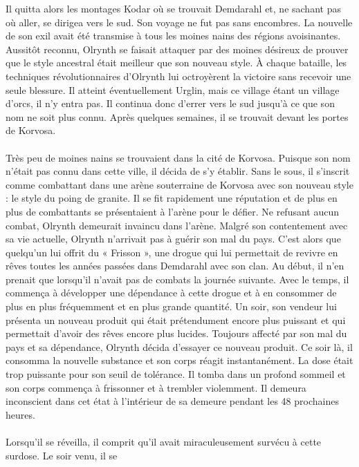 \documentclass[main.tex]{subfiles}
\begin{document}
    Il quitta alors les montages Kodar où se trouvait Demdarahl et, ne sachant pas où aller, se dirigea vers
    le sud. Son voyage ne fut pas sans encombres. La nouvelle de son exil avait été transmise à tous les moines
    nains des régions avoisinantes. Aussitôt reconnu, Olrynth se faisait attaquer par des moines désireux de
    prouver que le style ancestral était meilleur que son nouveau style. À chaque bataille, les techniques
    révolutionnaires d'Olrynth lui octroyèrent la victoire sans recevoir une seule blessure. Il atteint
    éventuellement Urglin, mais ce village étant un village d'orcs, il n'y entra pas. Il continua donc d'errer
    vers le sud jusqu'à ce que son nom ne soit plus connu. Après quelques semaines, il se trouvait devant les
    portes de Korvosa.\\
    \\
    Très peu de moines nains se trouvaient dans la cité de Korvosa. Puisque son nom n'était pas connu dans cette
    ville, il décida de s'y établir. Sans le sous, il s'inscrit comme combattant dans une arène souterraine de
    Korvosa avec son nouveau style : le style du poing de granite. Il se fit rapidement une réputation et de
    plus en plus de combattants se présentaient à l'arène pour le défier. Ne refusant aucun combat, Olrynth
    demeurait invaincu dans l'arène. Malgré son contentement avec sa vie actuelle, Olrynth n'arrivait pas à
    guérir son mal du pays. C'est alors que quelqu'un lui offrit du « Frisson », une drogue qui lui permettait de
    revivre en rêves toutes les années passées dans Demdarahl avec son clan. Au début, il n'en prenait que
    lorsqu'il n'avait pas de combats la journée suivante. Avec le temps, il commença à développer une dépendance
    à cette drogue et à en consommer de plus en plus fréquemment et en plus grande quantité. Un soir, son 
    vendeur lui présenta un nouveau produit qui était prétendument encore plus puissant et qui permettait 
    d'avoir des rêves encore plus lucides. Toujours affecté par son mal du pays et sa dépendance, Olrynth décida
    d'essayer ce nouveau produit. Ce soir là, il consomma la nouvelle substance et son corps réagit 
    instantanément. La dose était trop puissante pour son seuil de tolérance. Il tomba dans un profond sommeil 
    et son corps commença à frissonner et à trembler violemment. Il demeura inconscient dans cet état à 
    l'intérieur de sa demeure pendant les 48 prochaines heures.\\
    \\
    Lorsqu'il se réveilla, il comprit qu'il avait miraculeusement survécu à cette surdose. Le soir venu, il se
\end{document}
